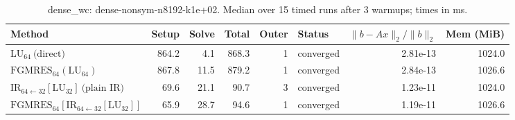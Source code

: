 \begin{table}[t]
\centering
\small
\caption{dense_wc: dense-nonsym-n8192-k1e+02. Median over 15 timed runs after 3 warmups; times in ms.}
\label{tab:dense_wc-dense-nonsym-n8192-k1e+02}
\begin{tabular}{lrrrrlrr}
\hline
Method & Setup & Solve & Total & Outer & Status & $\|b-Ax\|_2/\|b\|_2$ & Mem (MiB) \\
\hline
$\mathrm{LU}_{64}\ \text{(direct)}$ & 864.2 & 4.1 & 868.3 & 1 & converged & 2.81e-13 & 1024.0 \\
$\mathrm{FGMRES}_{64}(\mathrm{LU}_{64})$ & 867.8 & 11.5 & 879.2 & 1 & converged & 2.84e-13 & 1026.6 \\
$\mathrm{IR}_{64\leftarrow 32}[\mathrm{LU}_{32}]\ \text{(plain IR)}$ & 69.6 & 21.1 & 90.7 & 3 & converged & 1.23e-11 & 1024.0 \\
$\mathrm{FGMRES}_{64}[\mathrm{IR}_{64\leftarrow 32}[\mathrm{LU}_{32}]]$ & 65.9 & 28.7 & 94.6 & 1 & converged & 1.19e-11 & 1026.6 \\
\hline
\end{tabular}
\end{table}

